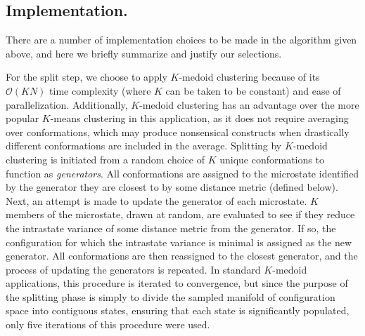 \subsection{Implementation.}
\label{section:methods:implementation}

There are a number of implementation choices to be made in the algorithm given above, and here we briefly summarize and justify our selections.

For the split step, we choose to apply $K$-medoid clustering \cite{hastie:2001a} because of its $\mathcal{O}(KN)$ time complexity (where $K$ can be taken to be constant) and ease of parallelization.
Additionally, $K$-medoid clustering has an advantage over the more popular $K$-means clustering \cite{macqueen:1967} in this application, as it does not require averaging over conformations, which may produce nonsensical constructs when drastically different conformations are included in the average.
Splitting by $K$-medoid clustering is initiated from a random choice of $K$ unique conformations to function as \emph{generators}.
All conformations are assigned to the microstate identified by the generator they are closest to by some distance metric (defined below).
Next, an attempt is made to update the generator of each microstate.
$K$ members of the microstate, drawn at random, are evaluated to see if they reduce the intrastate variance of some distance metric from the generator.
If so, the configuration for which the intrastate variance is minimal is assigned as the new generator.
All conformations are then reassigned to the closest generator, and the process of updating the generators is repeated.
In standard $K$-medoid applications, this procedure is iterated to convergence, but since the purpose of the splitting phase is simply to divide the sampled manifold of configuration space into contiguous states, ensuring that each state is significantly populated, only five iterations of this procedure were used.


